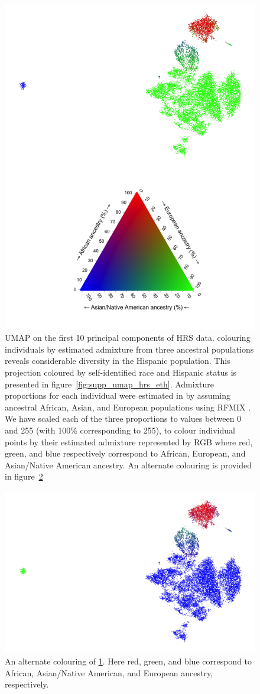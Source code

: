\documentclass[12pt]{pnas-new}
\begin{document}
\begin{figure}
\centering
   \includegraphics[width=0.6\linewidth]{images/HRS_1000G_NP1_UMAP_PC10_NC2_NN15_MD05_pca_1kgp_onto_hrs_umap_1kgp_onto_hrs_2018112221116_admix.jpeg}
   \caption{UMAP on the first 10 principal components of HRS data. colouring individuals by estimated admixture from three ancestral populations reveals considerable diversity in the Hispanic population. This projection coloured by self-identified race and Hispanic status is presented in figure~\ref{fig:supp_umap_hrs_eth}. Admixture proportions for each individual were estimated in \cite{baharian2016great} by assuming ancestral African, Asian, and European populations using RFMIX \cite{Maples:2013fia}. We have scaled each of the three proportions to values between 0 and 255 (with 100\% corresponding to 255), to colour individual points by their estimated admixture represented by RGB where red, green, and blue respectively correspond to African, European, and Asian/Native American ancestry. An alternate colouring is provided in figure~\ref{fig:umap_hrs_admix_alt}}
    \label{fig:umap_hrs_admix}
\end{figure}

\begin{figure}
\centering
   \includegraphics[width=0.6\linewidth]{images/HRS_1000G_NP1_UMAP_PC10_NC2_NN15_MD05_pca_1kgp_onto_hrs_umap_1kgp_onto_hrs_2018112221116_admix132.jpeg}
   \caption{An alternate colouring of \ref{fig:umap_hrs_admix}. Here red, green, and blue correspond to African, Asian/Native American, and European ancestry, respectively.}
    \label{fig:umap_hrs_admix_alt}
\end{figure}
\end{document}
